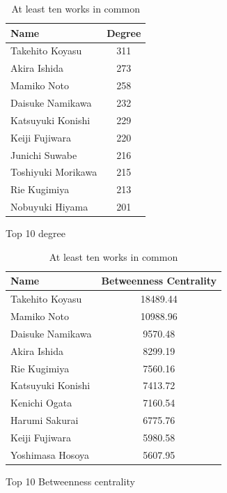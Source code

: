 \begin{table}[!htb]
    \begin{minipage}{.5\textwidth}
        \centering
            \begin{tabular}{|l|c|}
				\hline
				Name & Degree \\
				\hline
				Takehito Koyasu & 311 \\
				\hline
				Akira Ishida & 273 \\
				\hline
				Mamiko Noto & 258 \\
				\hline
				Daisuke Namikawa & 232 \\
				\hline
				Katsuyuki Konishi & 229 \\
				\hline
				Keiji Fujiwara & 220 \\
				\hline
				Junichi Suwabe & 216 \\
				\hline
				Toshiyuki Morikawa & 215 \\
				\hline
				Rie Kugimiya & 213 \\
				\hline
				Nobuyuki Hiyama & 201 \\
				\hline
			\end{tabular}
            \caption{Top 10 degree}
    \end{minipage}%
    \begin{minipage}{.6\textwidth}
        \centering
        \begin{tabular}{|l|c|}
				\hline
				Name & Betweenness Centrality \\
				\hline
				Takehito Koyasu & 18489.44 \\
				\hline
				Mamiko Noto & 10988.96 \\
				\hline
				Daisuke Namikawa & 9570.48 \\
				\hline
				Akira Ishida & 8299.19 \\
				\hline
				Rie Kugimiya & 7560.16 \\
				\hline
				Katsuyuki Konishi & 7413.72 \\
				\hline
				Kenichi Ogata & 7160.54 \\
				\hline
				Harumi Sakurai & 6775.76 \\
				\hline
				Keiji Fujiwara & 5980.58 \\
				\hline
				Yoshimasa Hosoya & 5607.95 \\
				\hline
		\end{tabular}
        \caption{Top 10 Betweenness centrality }
    \end{minipage}
    \caption{At least ten works in common}
    \label{tab:top10atLeast10Works}
\end{table}

